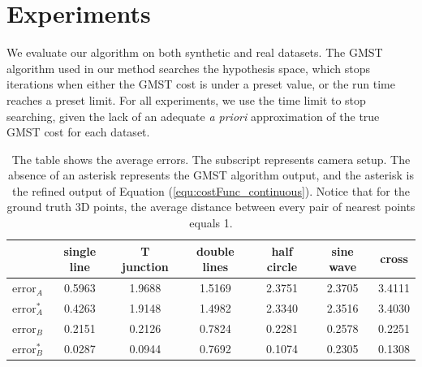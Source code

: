 
\section{Experiments}
We evaluate our algorithm on both synthetic and real datasets.
The GMST algorithm used in our method \cite{Ferreira_ESWA2012} searches the hypothesis space, which stops iterations when either the GMST cost is under a preset value, or the run time reaches a preset limit. For all experiments, we use the time limit to stop searching, given the lack of an adequate {\em a priori} approximation of the true  GMST cost for each dataset.
\begin{table}
\centering
\begin{tabular}{|c|c|c|c|c|c|c|}  \hline
               & single line & T junction & double lines & half circle & sine wave & cross \\
  \hline
  $\text{error}_A$ & 0.5963 & 1.9688 & 1.5169 & 2.3751  & 2.3705 & 3.4111\\
  \hline
  $\text{error}^*_A$ & 0.4263 & 1.9148 & 1.4982 & 2.3340  & 2.3516 & 3.4030 \\
  \hline
  $\text{error}_B$ & 0.2151 & 0.2126 & 0.7824 & 0.2281& 0.2578 &0.2251 \\
  \hline
  $\text{error}^*_B$ & 0.0287 & 0.0944 & 0.7692 & 0.1074 & 0.2305 & 0.1308\\
  \hline
\end{tabular}
\caption[Quantitative evaluation of JOST on synthetic data]{ The table shows the average errors. The subscript represents camera setup. The absence of an asterisk represents the GMST algorithm output, and the asterisk is the refined output of Equation (\ref{equ:costFunc_continuous}). Notice that for the ground truth 3D points, the average distance between every pair of nearest points equals 1. }
\label{fig:syntheticDataResult}
\end{table}

